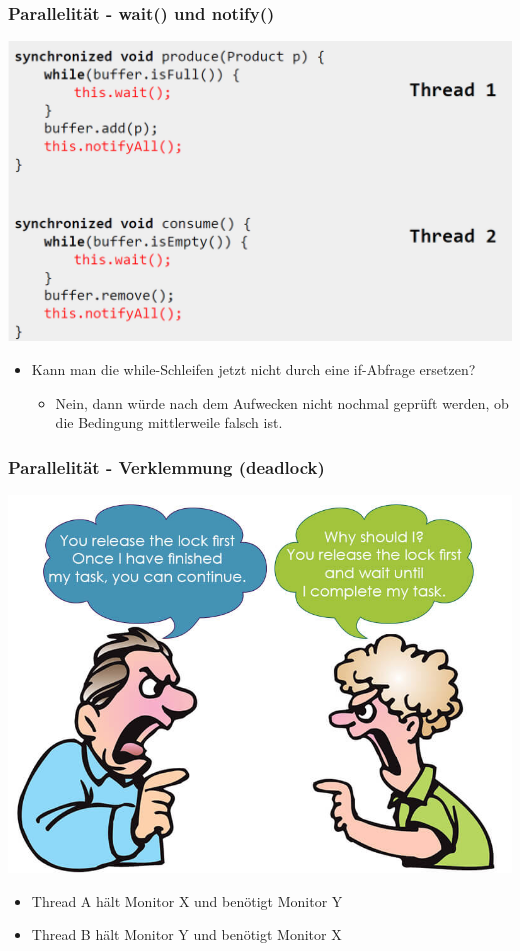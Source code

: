 \documentclass[18pt]{beamer}
\begin{document}
	\begin{frame}
		\frametitle{Parallelität - wait() und notify()}
		\includegraphics[scale=0.3]{./pics/tut5/cons-prod-sol.png}
		\begin{itemize}
			\item Kann man die while-Schleifen jetzt nicht durch eine if-Abfrage ersetzen? \pause
			\begin{itemize}
				\item Nein, dann würde nach dem Aufwecken nicht nochmal geprüft werden, ob die Bedingung mittlerweile falsch ist.
			\end{itemize}
		\end{itemize}
	\end{frame}


	\begin{frame}
		\frametitle{Parallelität - Verklemmung (deadlock)}
		\includegraphics[scale=0.3]{./pics/tut5/deadlock.jpg}
		\pause
		\begin{itemize}
			\item Thread A hält Monitor X und benötigt Monitor Y
			\item Thread B hält Monitor Y und benötigt Monitor X
		\end{itemize}
	\end{frame}
\end{document}
